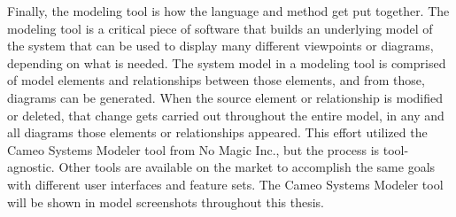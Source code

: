 Finally, the modeling tool is how the language and method get put together. The modeling tool is a critical piece of software that builds an underlying model of the system that can be used to display many different viewpoints or diagrams, depending on what is needed. The system model in a modeling tool is comprised of model elements and relationships between those elements, and from those, diagrams can be generated. When the source element or relationship is modified or deleted, that change gets carried out throughout the entire model, in any and all diagrams those elements or relationships appeared. This effort utilized the Cameo Systems Modeler tool from No Magic Inc., but the process is tool-agnostic. Other tools are available on the market to accomplish the same goals with different user interfaces and feature sets. The Cameo Systems Modeler tool will be shown in model screenshots throughout this thesis. 
